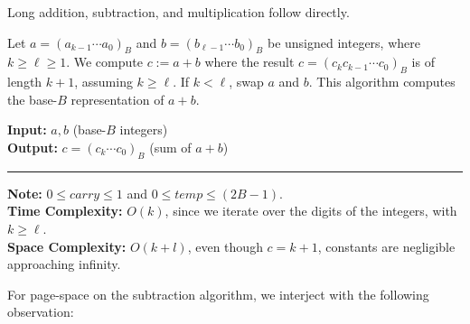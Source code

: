 \newpage 
\noindent
Long addition, subtraction, and multiplication follow directly.

\begin{Func}
    Let $a = (a_{k-1} \cdots a_0)_B$ and $b = (b_{\ell-1} \cdots b_0)_B$ be unsigned integers, where $k \geq \ell \geq 1$. We compute $c := a + b$ where the result $c = (c_{k}c_{k-1} \cdots c_0)_B$ is of length $k+1$, assuming $k \geq \ell$. If $k < \ell$, swap $a$ and $b$. This algorithm computes the base-$B$ representation of $a + b$.

    \vspace{.5em}
    \noindent
    \textbf{Input:} $a, b$ (base-$B$ integers)\\
    \textbf{Output:} $c = (c_k \cdots c_0)_B$ (sum of $a + b$)\\

    \begin{algorithm}[H]
        \SetAlgoLined
    \end{algorithm}
    \noindent\rule{\textwidth}{0.4pt}

    \noindent
    \textbf{Note:} $0\leq \textit{carry} \leq 1$ and $0\leq \textit{temp}\leq(2B-1)$.\\
    \textbf{Time Complexity:} $O(k)$, since we iterate over the digits of the integers, with $k \geq \ell$.\\
    \textbf{Space Complexity:} $O(k+l)$, even though $c=k+1$, constants are negligible approaching infinity.
\end{Func}

\noindent
For page-space on the subtraction algorithm, we interject with the following observation:

